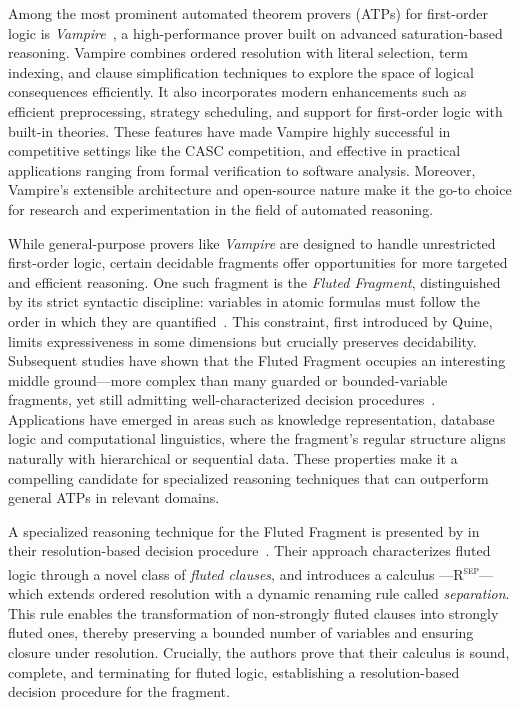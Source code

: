 Among the most prominent automated theorem provers (ATPs) for first-order logic is \textit{Vampire}~\cite{kovacs2013vampire}, a high-performance prover built on advanced saturation-based reasoning.
Vampire combines ordered resolution with literal selection, term indexing, and clause simplification techniques to explore the space of logical consequences efficiently.
It also incorporates modern enhancements such as efficient preprocessing, strategy scheduling, and support for first-order logic with built-in theories.
These features have made Vampire highly successful in competitive settings like the CASC competition, and effective in practical applications ranging from formal verification to software analysis.
Moreover, Vampire's extensible architecture and open-source nature make it the go-to choice for research and experimentation in the field of automated reasoning.

While general-purpose provers like \textit{Vampire} are designed to handle unrestricted first-order logic, certain decidable fragments offer opportunities for more targeted and efficient reasoning.
One such fragment is the \emph{Fluted Fragment}, distinguished by its strict syntactic discipline: variables in atomic formulas must follow the order in which they are quantified~\cite{quine1968predicate}.
This constraint, first introduced by Quine, limits expressiveness in some dimensions but crucially preserves decidability. Subsequent studies have shown that the Fluted Fragment occupies an interesting middle ground—more complex than many guarded or bounded-variable fragments, yet still admitting well-characterized decision procedures~\cite{pratt2019fluted}.
Applications have emerged in areas such as knowledge representation, database logic and computational linguistics, where the fragment’s regular structure aligns naturally with hierarchical or sequential data.
These properties make it a compelling candidate for specialized reasoning techniques that can outperform general ATPs in relevant domains.

A specialized reasoning technique for the Fluted Fragment is presented by \citeauthor{schmidt2000resolution} in their resolution-based decision procedure~\cite{schmidt2000resolution}.
Their approach characterizes fluted logic through a novel class of \emph{fluted clauses}, and introduces a calculus ---\textsc{R\textsuperscript{sep}}--- which extends ordered resolution with a dynamic renaming rule called \emph{separation}.
This rule enables the transformation of non-strongly fluted clauses into strongly fluted ones, thereby preserving a bounded number of variables and ensuring closure under resolution.
Crucially, the authors prove that their calculus is sound, complete, and terminating for fluted logic, establishing a resolution-based decision procedure for the fragment.

